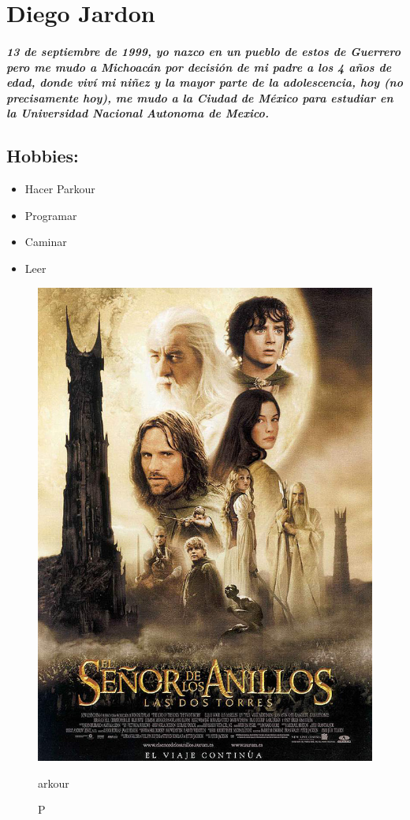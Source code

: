 \chapter{Diego Jardon}
\paragraph{
  13 de septiembre de 1999, yo nazco en un pueblo de estos de Guerrero pero me mudo a Michoacán por decisión de mi padre a los 4 años de edad, donde viví mi niñez y la mayor parte de la adolescencia, hoy (no precisamente hoy), me mudo a la Ciudad de México para estudiar en la Universidad Nacional Autonoma de Mexico.
}

\section{Hobbies:}

\begin{itemize}
\item Hacer Parkour
    \item Programar
    \item Caminar
    \item Leer \cite{comunidad}
\end{itemize}

\begin{figure}[h]
  \centering
  \includegraphics[scale=0.15]{IMG/13.jpg}
  \caption Parkour
\end{figure}
